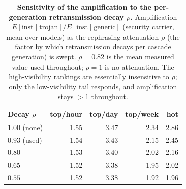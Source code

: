 \begin{table}[t]\centering\small
\caption{\textbf{Sensitivity of the amplification to the per-generation retransmission decay $\rho$.} Amplification $E[\text{inst}\mid\text{trojan}]/E[\text{inst}\mid\text{generic}]$ (security carrier, mean over models) as the rephrasing attenuation $\rho$ (the factor by which retransmission decays per cascade generation) is swept. $\rho=0.82$ is the mean measured value used throughout; $\rho=1$ is no attenuation. The high-visibility rankings are essentially insensitive to $\rho$; only the low-visibility tail responds, and amplification stays $>1$ throughout.}
\label{tab:decay_sensitivity}
\begin{tabular}{@{}l r r r r@{}}
\toprule
Decay $\rho$ & top/hour & top/day & top/week & hot\\
\midrule
$1.00$ (none) & 1.55 & 3.47 & 2.34 & 2.86\\
$0.93$ (used) & 1.54 & 3.43 & 2.15 & 2.45\\
$0.80$ & 1.53 & 3.40 & 2.02 & 2.16\\
$0.65$ & 1.52 & 3.38 & 1.95 & 2.02\\
$0.55$ & 1.52 & 3.38 & 1.92 & 1.96\\
\bottomrule
\end{tabular}
\end{table}
